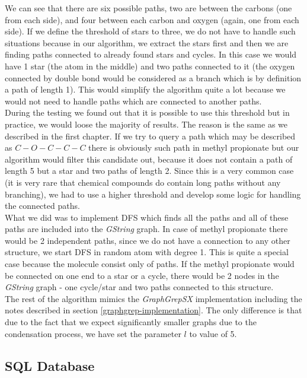 {We can see that there are six possible paths, two are between the carbons (one from each side), and four between each carbon and oxygen (again, one from each side). If we define the threshold of stars to three, we do not have to handle such situations because in our algorithm, we extract the stars first and then we are finding paths connected to already found stars and cycles. In this case we would have 1 star (the atom in the middle) and two paths connected to it (the oxygen connected by double bond would be considered as a branch which is by definition a path of length 1). This would simplify the algorithm quite a lot because we would not need to handle paths which are connected to another paths.\\

During the testing we found out that it is possible to use this threshold but in practice, we would loose the majority of results. The reason is the same as we described in the first chapter. If we try to query a path which may be described as $C-O-C-C-C$ there is obviously such path in methyl propionate but our algorithm would filter this candidate out, because it does not contain a path of length 5 but a star and two paths of length 2. Since this is a very common case (it is very rare that chemical compounds do contain long paths without any branching), we had to use a higher threshold and develop some logic for handling the connected paths.\\

What we did was to implement DFS which finds all the paths and all of these paths are included into the \textit{GString} graph. In case of methyl propionate there would be 2 independent paths, since we do not have a connection to any other structure, we start DFS in random atom with degree 1. This is quite a special case because the molecule consist only of paths. If the methyl propionate would be connected on one end to a star or a cycle, there would be 2 nodes in the \textit{GString} graph - one cycle/star and two paths connected to this structure.\\

The rest of the algorithm mimics the \textit{GraphGrepSX} implementation including the notes described in section \ref{graphgrep-implementation}. The only difference is that due to the fact that we expect significantly smaller graphs due to the condensation process, we have set the parameter $l$ to value of 5.

\subsection{SQL Database}

}
